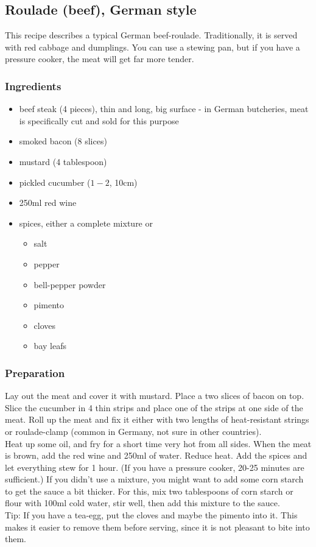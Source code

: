 \subsection{Roulade (beef), German style}
This recipe describes a typical German beef-roulade. Traditionally, it is served with red cabbage and dumplings.
You can use a stewing pan, but if you have a pressure cooker, the meat will get far more tender.\\

\subsubsection{Ingredients}
\begin{itemize}
\item{beef steak (4 pieces), thin and long, big surface - in German butcheries, meat is specifically cut and sold for this purpose}
\item{smoked bacon (8 slices)}
\item{mustard (4 tablespoon)}
\item{pickled cucumber ($1-2$, 10cm)}
\item{250ml red wine}
\item{spices, either a complete mixture or}
\begin{itemize}
\item{salt}
\item{pepper}
\item{bell-pepper powder}
\item{pimento}
\item{cloves}
\item{bay leafs}
\end{itemize}
\end{itemize}
  

\subsubsection{Preparation}
Lay out the meat and cover it with mustard. Place a two slices of bacon on top. Slice the cucumber in 4 thin strips and place one of the strips at one side of the meat. Roll up the meat and fix it either with two lengths of heat-resistant strings or roulade-clamp (common in Germany, not sure in other countries).\\
Heat up some oil, and fry for a short time very hot from all sides. When the meat is brown, add the red wine and 250ml of water. Reduce heat. Add the spices and let everything stew for 1 hour. (If you have a pressure cooker, 20-25 minutes are sufficient.) If you didn't use a mixture, you might want to add some corn starch to get the sauce a bit thicker. For this, mix two tablespoons of corn starch or flour with 100ml cold water, stir well, then add this mixture to the sauce.\\
Tip: If you have a tea-egg, put the cloves and maybe the pimento into it. This makes it easier to remove them before serving, since it is not pleasant to bite into them.

